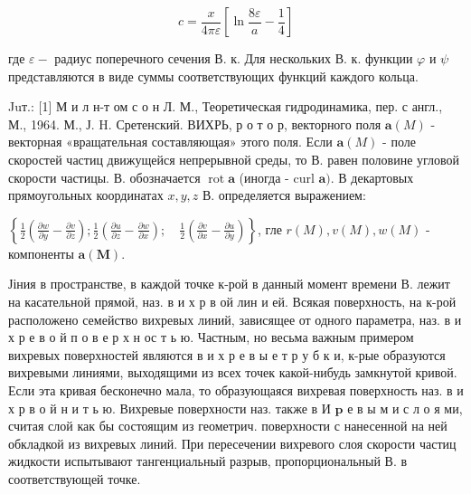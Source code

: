 \documentclass[10pt]{article}
\begin{document}
\[

c=\frac{x}{4 \pi \varepsilon}\left[\ln \frac{8 \varepsilon}{a}-\frac{1}{4}\right]

\]



где $\varepsilon-$ радиус поперечного сечения В. к. Для нескольких В. к. функции $\varphi$ и $\psi$ представляются в виде суммы соответствующих функций каждого кольца.



Juт.: [1] М и л н-т ом с о н Л. М., Теоретическая гидродинамика, пер. с англ., М., 1964. М., Ј. H. Сретенский. ВИХРЬ, р о т о р, векторного поля $\boldsymbol{a}(M)$ - векторная «вращательная составляющая» этого поля. Если $\boldsymbol{a}(M)$ - поле скоростей частиц движущейся непрерывной среды, то В. равен половине угловой скорости частицы. В. обозначается $\operatorname{rot} \boldsymbol{a}$ (иногда - curl $\boldsymbol{a})$. В декартовых прямоугольных координатах $x, y, z$ В. определяется выражением:



$\left\{\frac{1}{2}\left(\frac{\partial w}{\partial y}-\frac{\partial v}{\partial z}\right) ; \frac{1}{2}\left(\frac{\partial u}{\partial z}-\frac{\partial w}{\partial x}\right) ; \quad \frac{1}{2}\left(\frac{\partial v}{\partial x}-\frac{\partial u}{\partial y}\right)\right\}$, гле $r(M), v(M), w(M)$ - компоненты $\boldsymbol{a}(\boldsymbol{M})$.



Јіния в пространстве, в каждой точке к-рой в данный момент времени В. лежит на касательной прямой, наз. в и х р в ой лин и ей. Всякая поверхность, на к-рой расположено семейство вихревых линий, зависящее от одного параметра, наз. в и х р е в о й $п$ о в е р х н ос т ь ю. Частным, но весьма важным примером вихревых поверхностей являются в и х р е в ы е т р у б к и, к-рые образуются вихревыми линиями, выходящими из всех точек какой-нибудь замкнутой кривой. Если эта кривая бесконечно мала, то образующаяся вихревая поверхность наз. в и х р в о й н и т ь ю. Вихревые поверхности наз. также в И $\mathbf{p}$ е в ы м и с л о я ми, считая слой как бы состоящим из геометрич. поверхности с нанесенной на ней обкладкой из вихревых линий. При пересечении вихревого слоя скорости частиц жидкости испытывают тангенциальный разрыв, пропорциональный В. в соответствующей точке.
\end{document}
